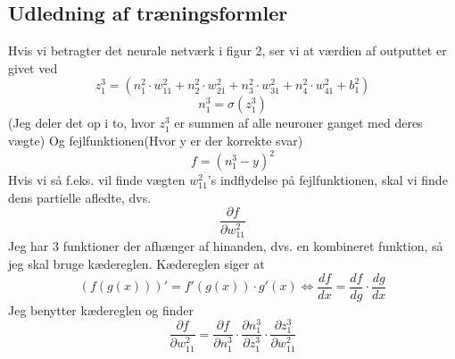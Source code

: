 \subsection{Udledning af træningsformler}

Hvis vi betragter det neurale netværk i figur 2, ser vi at værdien af outputtet er givet ved
$$z^3_1 = (n^2_1 \cdot w^2_{11} + n^2_2 \cdot w^2_{21} + n^2_3 \cdot w^2_{31} + n^2_4 \cdot w^2_{41} + b^2_1)$$
$$n^3_1 = \sigma (z^3_1)$$
(Jeg deler det op i to, hvor $z^3_1$ er summen af alle neuroner ganget med deres vægte)
Og fejlfunktionen(Hvor y er der korrekte svar)
$$f=(n^3_1-y)^2$$
Hvis vi så f.eks. vil finde vægten $w^2_{11}$'s indflydelse på fejlfunktionen, skal vi finde dens partielle afledte, dvs.
$$\frac{\partial f}{\partial w^2_{11}}$$
Jeg har 3 funktioner der afhænger af hinanden, dvs. en kombineret funktion, så jeg skal bruge kædereglen. 
Kædereglen siger at 
$$(f(g(x)))' = f'(g(x)) \cdot g'(x) \Leftrightarrow \frac{df}{dx} = \frac{df}{dg}\cdot \frac{dg}{dx}$$
Jeg benytter kædereglen og finder
$$\frac{\partial f}{\partial w^2_{11}} = \frac{\partial f}{\partial n^3_1} \cdot \frac{\partial n^3_1}{\partial z^3_1} \cdot \frac{\partial z^3_1}{\partial w^2_{11}}$$

